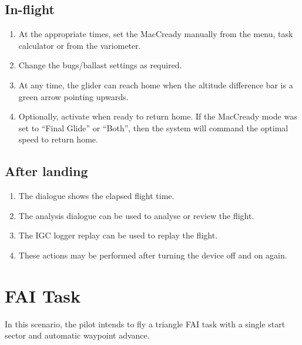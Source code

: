 \subsection*{In-flight}
\begin{enumerate}
\item  At the appropriate times, set the MacCready manually from the menu,
  task calculator or from the variometer.
\item  Change the bugs/ballast settings as required.
\item  At any time, the glider can reach home when the altitude difference
  bar is a green arrow pointing upwards.
\item  Optionally, activate  when ready to return
home. If the MacCready mode was set to ``Final Glide'' or ``Both'', then the
system will command the optimal speed to return home.
\end{enumerate}

\subsection*{After landing}
\begin{enumerate}
\item  The  dialogue shows the elapsed flight time.
\item  The analysis dialogue can be used to analyse or review the flight.
\item  The IGC logger replay can be used to replay the flight.
\item  These actions may be performed after turning the device off and
  on again.
\end{enumerate}

\section{FAI Task}\label{sec:fai-task}

In this scenario, the pilot intends to fly a triangle FAI task with a
single start sector and automatic waypoint advance.

